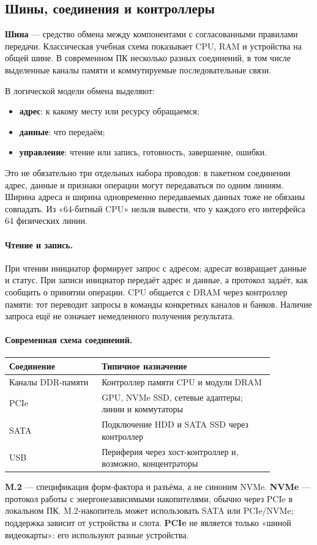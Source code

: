 \subsection{Шины, соединения и контроллеры}
\textbf{Шина} --- средство обмена между компонентами с согласованными
правилами передачи. Классическая учебная схема показывает CPU, RAM и
устройства на общей шине. В современном ПК несколько разных соединений,
в том числе выделенные каналы памяти и коммутируемые последовательные связи.

В логической модели обмена выделяют:
\begin{itemize}
\item \textbf{адрес}: к какому месту или ресурсу обращаемся;
\item \textbf{данные}: что передаём;
\item \textbf{управление}: чтение или запись, готовность, завершение, ошибки.
\end{itemize}
Это не обязательно три отдельных набора проводов: в пакетном соединении
адрес, данные и признаки операции могут передаваться по одним линиям.
Ширина адреса и ширина одновременно передаваемых данных тоже не обязаны
совпадать. Из «64-битный CPU» нельзя вывести, что у каждого его интерфейса
64 физических линии.

\paragraph{Чтение и запись.}
При чтении инициатор формирует запрос с адресом; адресат возвращает данные
и статус. При записи инициатор передаёт адрес и данные, а протокол задаёт,
как сообщить о принятии операции. CPU общается с DRAM через контроллер
памяти: тот переводит запросы в команды конкретных каналов и банков.
Наличие запроса ещё не означает немедленного получения результата.

\paragraph{Современная схема соединений.}
\begin{center}
\small
\begin{tabular}{|p{0.3\linewidth}|p{0.56\linewidth}|}
\hline
Соединение & Типичное назначение \\
\hline
Каналы DDR-памяти & Контроллер памяти CPU и модули DRAM \\
PCIe & GPU, NVMe SSD, сетевые адаптеры; линии и коммутаторы \\
SATA & Подключение HDD и SATA SSD через контроллер \\
USB & Периферия через хост-контроллер и, возможно, концентраторы \\
\hline
\end{tabular}
\end{center}
\textbf{M.2} --- спецификация форм-фактора и разъёма, а не синоним NVMe.
\textbf{NVMe} --- протокол работы с энергонезависимыми накопителями,
обычно через PCIe в локальном ПК. M.2-накопитель может использовать SATA
или PCIe/NVMe; поддержка зависит от устройства и слота. \textbf{PCIe}
не является только «шиной видеокарты»: его используют разные устройства.

